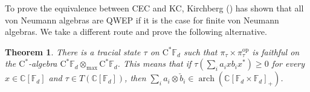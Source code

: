 \documentclass[12pt]{amsart}
\newtheorem{thm}{Theorem}
\theoremstyle{definition}
\begin{document}
To prove the equivalence between CEC and KC, Kirchberg (\cite{kirchberg}) has shown
that all von Neumann algebras are QWEP if it is the case for finite von Neumann algebras.
We take a different route and prove the following alternative.

\begin{thm}\label{thm:kirchbergm}
There is a tracial state $\tau$ on $\mathrm{C^*}{{\mathbb F}}_d$ such that
$\pi_\tau\times\pi_\tau^{\mathrm{op}}$ is faithful on the {$\mathrm{C}^*$-alge\-bra\xspace}
$\mathrm{C^*}{{\mathbb F}}_d\otimes_{\max}\mathrm{C^*}{{\mathbb F}}_d$.
This means that if $\tau(\sum_i a_ixb_ix^*)\geq0$ for every
$x\in{{\mathbb C}}[{{\mathbb F}}_d]$ and $\tau\in T({{\mathbb C}}[{{\mathbb F}}_d])$,
then $\sum_i a_i\otimes \check{b}_i\in\operatorname*{arch}({{\mathbb C}}[{{\mathbb F}}_d\times{{\mathbb F}}_d]_+)$.
\end{thm}
\end{document}
